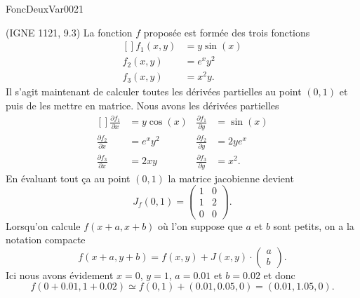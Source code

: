 
\begin{corrige}{FoncDeuxVar0021}

	(IGNE 1121, 9.3) La fonction $f$ proposée est formée des trois fonctions
	\begin{equation}
		\begin{aligned}[]
			f_1(x,y)&=y\sin(x)\\
			f_2(x,y)&= e^{x}y^2\\
			f_3(x,y)&=x^2y.
		\end{aligned}
	\end{equation}
	Il s'agit maintenant de calculer toutes les dérivées partielles au point $(0,1)$ et puis de les mettre en matrice. Nous avons les dérivées partielles
	\begin{equation}
		\begin{aligned}[]
			\frac{ \partial f_1 }{ \partial x }&=y\cos(x)	& \frac{ \partial f_1 }{ \partial y }&=\sin(x)\\
			\frac{ \partial f_2 }{ \partial x }&=e^xy^2	& \frac{ \partial f_2 }{ \partial y }&=2ye^x\\
			\frac{ \partial f_3 }{ \partial x }&=2xy	& \frac{ \partial f_3 }{ \partial y }&=x^2.
		\end{aligned}
	\end{equation}
	En évaluant tout ça au point $(0,1)$ la matrice jacobienne devient
	\begin{equation}
		J_f(0,1)=\begin{pmatrix}
			1	&	0	\\
			1	&	2	\\
			0	&	0	
		\end{pmatrix}.
	\end{equation}
	Lorsqu'on calcule $f(x+a,x+b)$ où l'on suppose que $a$ et $b$ sont petits, on a la notation compacte
	\begin{equation}
		f(x+a,y+b)=f(x,y)+J(x,y)\cdot\begin{pmatrix}
			a	\\ 
			b	
		\end{pmatrix}.
	\end{equation}
	Ici nous avons évidement $x=0$, $y=1$, $a=0.01$ et $b=0.02$ et donc
	\begin{equation}
		f(0+0.01,1+0.02)\simeq f(0,1)+(0.01,0.05,0)=(0.01,1.05,0).
	\end{equation}

\end{corrige}
